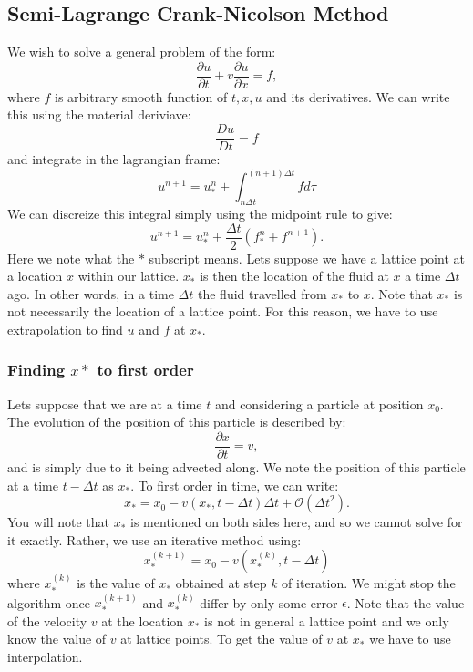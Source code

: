 \documentclass{article}
\begin{document}
\subsection*{Semi-Lagrange Crank-Nicolson Method}
We wish to solve a general problem of the form:
\begin{equation}
	\frac{\partial u}{\partial t} + v \frac{\partial u}{\partial x} = f,
\end{equation}
where $f$ is arbitrary smooth function of $t,x,u$ and its derivatives.
\newline
We can write this using the material deriviave:
\begin{equation}
	\frac{D u}{D t} = f
\end{equation}
and integrate in the lagrangian frame:
\begin{equation}
	u^{n+1} = u^{n}_{*} + \int_{n \Delta t}^{(n+1) \Delta t} f d \tau
\end{equation}
We can discreize this integral simply using the midpoint rule to give:
\begin{equation}
	u^{n+1} = u^{n}_{*} + \frac{\Delta t}{2} (f^{n}_{*} + f^{n+1}).
\end{equation}
Here we note what the $*$ subscript means. Lets suppose we have a lattice point at a location $x$ within our lattice. $x_{*}$ is then the location of the fluid at $x$ a time $\Delta t$ ago. In other words, in a time $\Delta t$ the fluid travelled 
from $x_{*}$ to $x$. Note that $x_{*}$ is not necessarily the location of a lattice point. For this reason, we have to use extrapolation to find $u$ and $f$ at $x_*$.


\subsubsection*{Finding $x*$ to first order}
Lets suppose that we are at a time $t$ and considering a particle at position $x_0$. The evolution of the position of this particle is described by:
\begin{equation}
	\frac{\partial x}{\partial t} = v,
\end{equation}
and is simply due to it being advected along. We note the position of this particle at a time $t-\Delta t$ as $x_*$. To first order in time, we can write:
\begin{equation}
	x_{*} = x_0 - v(x_{*}, t-\Delta t) \Delta t + \mathcal{O}({\Delta t}^2).
\end{equation}
You will note that $x_*$ is mentioned on both sides here, and so we cannot solve for it exactly. Rather, we use an iterative method using:
\begin{equation}
	x_{*}^{(k+1)} = x_0 - v(x_{*}^{(k)}, t  - \Delta t ) 
\end{equation}
where $x_{*}^{(k)}$ is the value of $x_{*}$ obtained at step $k$ of iteration. We might stop the algorithm once $x_{*}^{(k+1)}$ and $x_{*}^{(k)}$ differ by only some error $\epsilon$. Note that the value of the velocity $v$ at the location $x_*$ is not in general a lattice point and we only know the value of $v$ at lattice points. To get the value of $v$ at $x_{*}$ we have to use interpolation.
\end{document}
